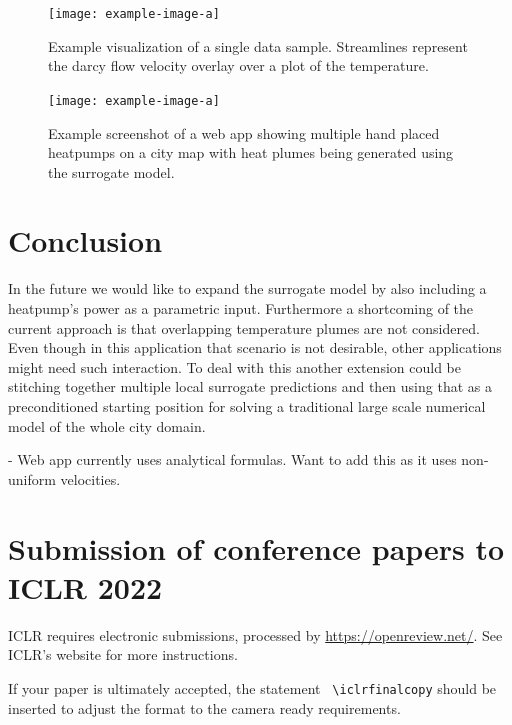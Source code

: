 \documentclass{article} %
\begin{document}
\begin{figure}[htb]
   \centering
   \texttt{[image: example-image-a]}
   \caption{Example visualization of a single data sample. Streamlines represent the darcy flow velocity overlay over a plot of the temperature.}
\end{figure}



\begin{figure}[htb]
   \centering
   \texttt{[image: example-image-a]}
   \caption{Example screenshot of a web app showing multiple hand placed heatpumps on a city map with heat plumes being generated using the surrogate model.}
\end{figure}

\section{Conclusion}
\label{sec:conclusion}




In the future we would like to expand the surrogate model by also including a heatpump's power as a parametric input.
Furthermore a shortcoming of the current approach is that overlapping temperature plumes are not considered.
Even though in this application that scenario is not desirable, other applications might need such interaction.
To deal with this another extension could be stitching together multiple local surrogate predictions and then using that as a preconditioned starting position for solving a traditional large scale numerical model of the whole city domain.

- Web app currently uses analytical formulas. Want to add this as it uses non-uniform velocities.

\section{Submission of conference papers to ICLR 2022}

ICLR requires electronic submissions, processed by
\url{https://openreview.net/}. See ICLR's website for more instructions.

If your paper is ultimately accepted, the statement {\tt
      {\textbackslash}iclrfinalcopy} should be inserted to adjust the
format to the camera ready requirements.
\end{document}
